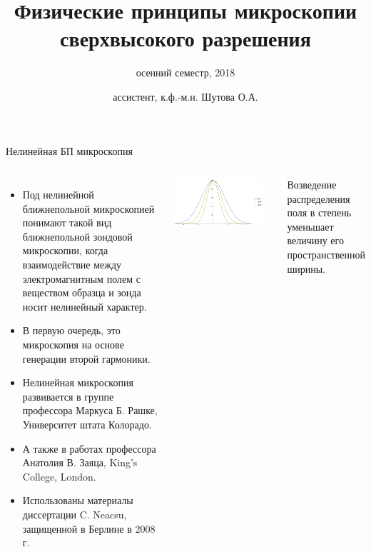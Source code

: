\documentclass[9pt, compress, xcolor=table]{beamer}
\title{Физические принципы микроскопии сверхвысокого разрешения}
\subtitle{осенний семестр, 2018}
\author{ассистент, к.ф.-м.н. Шутова О.А.}
\institute{МГУ им. М.В. Ломоносова, физический факультет}
\begin{document}
\maketitle


\begin{frame}{Нелинейная БП микроскопия}

\begin{columns}[c]
\column{6.5cm}

\begin{itemize}
    \item Под нелинейной ближнепольной микроскопией понимают такой вид ближнепольной зондовой микроскопии, когда взаимодействие между электромагнитным полем с веществом образца и зонда носит нелинейный характер. 

\item В первую очередь, это микроскопия на основе генерации второй гармоники.


\item Нелинейная микроскопия развивается в группе профессора Маркуса Б. Рашке, Университет штата Колорадо.

\item А также в работах профессора Анатолия В. Заяца, King's College, London.

\item Использованы материалы диссертации C. Neacsu, защищенной в Берлине в 2008 г.
\end{itemize}
\column{6cm}
\begin{center}
\includegraphics[width=0.9\textwidth]{gauss}
\end{center}
Возведение распределения поля в степень уменьшает величину его пространственной ширины.

\end{columns}
\end{frame}
\end{document}
